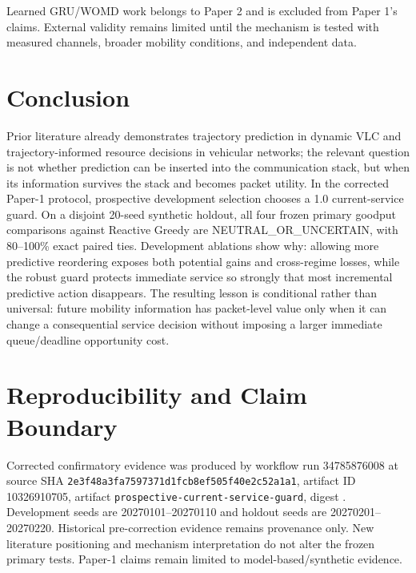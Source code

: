 \documentclass[conference]{IEEEtran}
\begin{document}
Learned GRU/WOMD work belongs to Paper 2 and is excluded from Paper 1's claims. External validity remains limited until the mechanism is tested with measured channels, broader mobility conditions, and independent data.

\section{Conclusion}
Prior literature already demonstrates trajectory prediction in dynamic VLC and trajectory-informed resource decisions in vehicular networks; the relevant question is not whether prediction can be inserted into the communication stack, but when its information survives the stack and becomes packet utility. In the corrected Paper-1 protocol, prospective development selection chooses a 1.0 current-service guard. On a disjoint 20-seed synthetic holdout, all four frozen primary goodput comparisons against Reactive Greedy are NEUTRAL\_OR\_UNCERTAIN, with 80--100\% exact paired ties. Development ablations show why: allowing more predictive reordering exposes both potential gains and cross-regime losses, while the robust guard protects immediate service so strongly that most incremental predictive action disappears. The resulting lesson is conditional rather than universal: future mobility information has packet-level value only when it can change a consequential service decision without imposing a larger immediate queue/deadline opportunity cost.

\section*{Reproducibility and Claim Boundary}
Corrected confirmatory evidence was produced by workflow run 34785876008 at source SHA \texttt{2e3f48a3fa7597371d1fcb8ef505f40e2c52a1a1}, artifact ID 10326910705, artifact \texttt{prospective-current-service-guard}, digest . Development seeds are 20270101--20270110 and holdout seeds are 20270201--20270220. Historical pre-correction evidence remains provenance only. New literature positioning and mechanism interpretation do not alter the frozen primary tests. Paper-1 claims remain limited to model-based/synthetic evidence.



\end{document}
